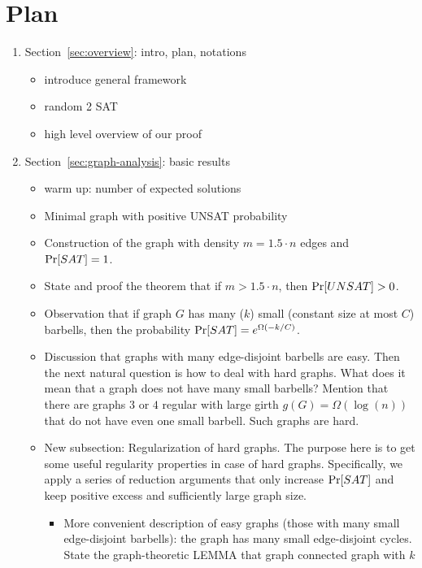 \setcounter{section}{-1}
\section{Plan}\label{sec:plan}

\begin{enumerate}[leftmargin=2.2em]
\item Section~\ref{sec:overview}: intro, plan, notations
  \begin{itemize}
  \item introduce general framework
  \item random 2 SAT
  \item high level overview of our proof
  \end{itemize}

\item Section~\ref{sec:graph-analysis}: basic results 
  \begin{itemize}
  \item warm up: number of expected solutions
  \item Minimal graph with positive UNSAT probability
  \item Construction of the graph with density $m= 1.5\cdot n$ edges and $\operatorname{Pr}[SAT]=1$.
  \item State and proof the theorem that if $m>1.5\cdot n$, then $\operatorname{Pr}[UNSAT] >0$.
  \item Observation that if graph $G$ has many ($k$) small (constant size at most $C$) barbells, then the probability $\operatorname{Pr}[SAT]=e^{\Omega(-k/C)}$.
  \item Discussion that graphs with many edge-disjoint barbells are easy. Then the next natural question is how to deal with hard graphs. What does it mean that a graph does not have many small barbells?
  Mention that there are graphs $3$ or $4$ regular with large girth $g(G)=\Omega(\log(n))$ that do not have even one small barbell. Such graphs are hard.
  \item New subsection: Regularization of hard graphs. The purpose here is to get some useful regularity properties in case of hard graphs. Specifically, we apply a series of reduction arguments that only increase $\operatorname{Pr}[SAT]$ and keep positive excess and sufficiently large graph size. 
  \begin{itemize}
  	\item More convenient description of easy graphs (those with many small edge-disjoint barbells): the graph has many small edge-disjoint cycles. State the graph-theoretic LEMMA that graph connected graph with $k$ 

\end{itemize}
\end{itemize}
\end{enumerate}
